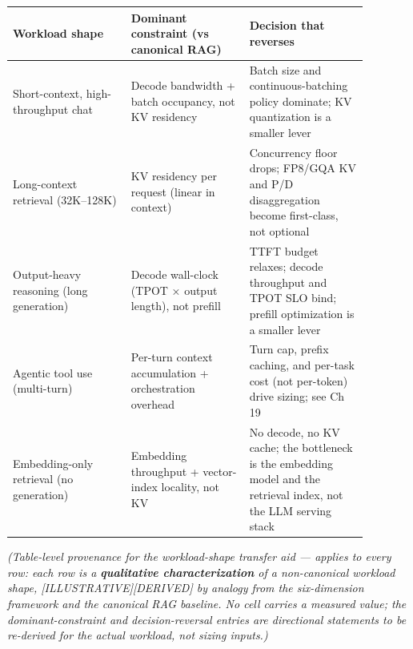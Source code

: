 \nopagebreak[4]
\begin{longtable}[]{@{}
  >{\raggedright\arraybackslash}p{0.2927\linewidth}
  >{\raggedright\arraybackslash}p{0.2927\linewidth}
  >{\raggedright\arraybackslash}p{0.2927\linewidth}@{}}
\toprule\noalign{}
\begin{minipage}[b]{\linewidth}\raggedright
Workload shape
\end{minipage} & \begin{minipage}[b]{\linewidth}\raggedright
Dominant constraint (vs canonical RAG)
\end{minipage} & \begin{minipage}[b]{\linewidth}\raggedright
Decision that reverses
\end{minipage} \\
\midrule\noalign{}
\endhead
\bottomrule\noalign{}
\endlastfoot
Short-context, high-throughput chat & Decode bandwidth + batch
occupancy, not KV residency & Batch size and continuous-batching policy
dominate; KV quantization is a smaller lever \\
\noalign{\label{tab:4.7}}
Long-context retrieval (32K--128K) & KV residency per request (linear in
context) & Concurrency floor drops; FP8/GQA KV and P/D disaggregation
become first-class, not optional \\
Output-heavy reasoning (long generation) & Decode wall-clock (TPOT ×
output length), not prefill & TTFT budget relaxes; decode throughput and
TPOT SLO bind; prefill optimization is a smaller lever \\
Agentic tool use (multi-turn) & Per-turn context accumulation +
orchestration overhead & Turn cap, prefix caching, and per-task cost
(not per-token) drive sizing; see Ch 19 \\
Embedding-only retrieval (no generation) & Embedding throughput +
vector-index locality, not KV & No decode, no KV cache; the bottleneck
is the embedding model and the retrieval index, not the LLM serving
stack \\
\end{longtable}

\emph{(Table-level provenance for the workload-shape transfer aid ---
applies to every row: each row is a \textbf{qualitative
characterization} of a non-canonical workload shape,
\mbox{{[}ILLUSTRATIVE{]}}\hspace{0pt}\mbox{{[}DERIVED{]}} by analogy from the six-dimension
framework and the canonical RAG baseline. No cell carries a measured
value; the dominant-constraint and decision-reversal entries are
directional statements to be re-derived for the actual workload, not
sizing inputs.)}

